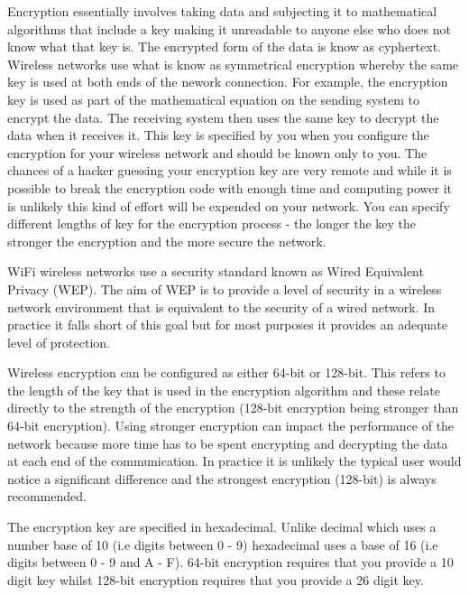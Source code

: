 Encryption essentially involves taking data and subjecting it to mathematical
algorithms that include a key making it unreadable to anyone else who does not
know what that key is. The encrypted form of the data is know as cyphertext.
Wireless networks use what is know as symmetrical encryption whereby the same
key is used at both ends of the nework connection. For example, the encryption
key is used as part of the mathematical equation on the sending system to
encrypt the data. The receiving system then uses the same key to decrypt the
data when it receives it. This key is specified by you when you configure the
encryption for your wireless network and should be known only to you. The
chances of a hacker guessing your encryption key are very remote and while it is
possible to break the encryption code with enough time and computing power it is
unlikely this kind of effort will be expended on your network. You can specify
different lengths of key for the encryption process - the longer the key the
stronger the encryption and the more secure the network.



WiFi wireless networks use a security standard known as Wired Equivalent Privacy
(WEP). The aim of WEP is to provide a level of security in a wireless network
environment that is equivalent to the security of a wired network. In practice
it falls short of this goal but for most purposes it provides an adequate level
of protection.



Wireless encryption can be configured as either 64-bit or 128-bit. This refers
to the length of the key that is used in the encryption algorithm and these
relate directly to the strength of the encryption (128-bit encryption being
stronger than 64-bit encryption). Using stronger encryption can impact the
performance of the network because more time has to be spent encrypting and
decrypting the data at each end of the communication. In practice it is unlikely
the typical user would notice a significant difference and the strongest
encryption (128-bit) is always recommended.



The encryption key are specified in hexadecimal. Unlike decimal which uses a
number base of 10 (i.e digits between 0 - 9) hexadecimal uses a base of 16 (i.e
digits between 0 - 9 and A - F). 64-bit encryption requires that you provide a
10 digit key whilst 128-bit encryption requires that you provide a 26 digit key.



